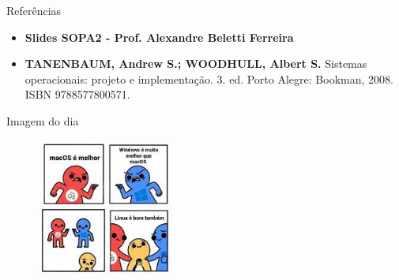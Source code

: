 \documentclass{beamer}
\begin{document}
\begin{frame}{Referências }\justifying
      \begin{itemize}
            \item \textbf{Slides SOPA2 - Prof. Alexandre Beletti Ferreira}
            \item \textbf{TANENBAUM, Andrew S.; WOODHULL, Albert S.} Sistemas operacionais: projeto e implementação. 3. ed. Porto Alegre: Bookman, 2008. ISBN 9788577800571.
      \end{itemize}
\end{frame}

\begin{frame}[fragile]{Imagem do dia}

    \begin{figure}[H]
        \centerline{\includegraphics[width=0.4\textwidth]{assets/imagem-do-dia/sope-02.jpeg}}
        
    \end{figure}
\end{frame}

\backmatter
\end{document}
